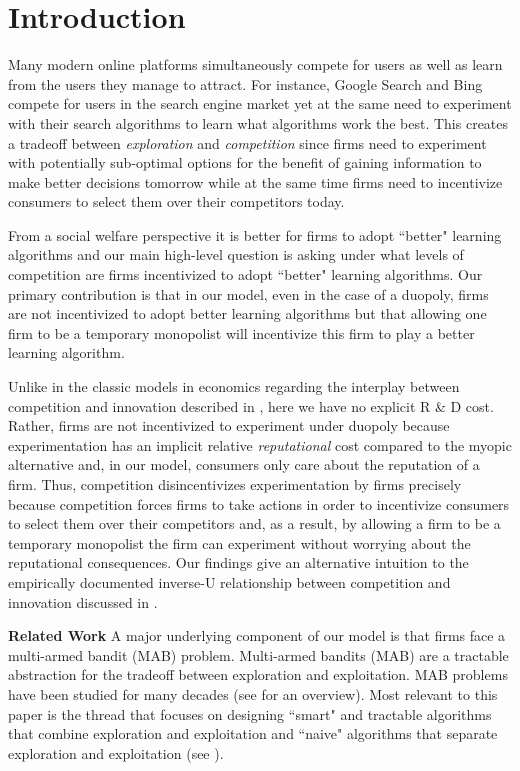 \documentclass{article}
\theoremstyle{definition}
\begin{document}
\section{Introduction}
\label{intro}

Many modern online platforms simultaneously compete for users as well as learn from the users they manage to attract. For instance, Google Search and Bing compete for users in the search engine market yet at the same need to experiment with their search algorithms to learn what algorithms work the best. This creates a tradeoff between \textit{exploration} and \textit{competition} since firms need to experiment with potentially sub-optimal options for the benefit of gaining information to make better decisions tomorrow while at the same time firms need to incentivize consumers to select them over their competitors today.

From a social welfare perspective it is better for firms to adopt ``better" learning algorithms and our main high-level question is asking under what levels of competition are firms incentivized to adopt ``better" learning algorithms. Our primary contribution is that in our model, even in the case of a duopoly, firms are not incentivized to adopt better learning algorithms but that allowing one firm to be a temporary monopolist will incentivize this firm to play a better learning algorithm. 

Unlike in the classic models in economics regarding the interplay between competition and innovation described in \citet{barro2004economic}, here we have no explicit R \& D cost. Rather, firms are not incentivized to experiment under duopoly because experimentation has an implicit relative \textit{reputational} cost compared to the myopic alternative and, in our model, consumers only care about the reputation of a firm. Thus, competition disincentivizes experimentation by firms precisely because competition forces firms to take actions in order to incentivize consumers to select them over their competitors and, as a result, by allowing a firm to be a temporary monopolist the firm can experiment without worrying about the reputational consequences. Our findings give an alternative intuition to the empirically documented inverse-U relationship between competition and innovation discussed in \citet{aghion2005competition}.

\textbf{Related Work} A major underlying component of our model is that firms face a multi-armed bandit (MAB) problem. Multi-armed bandits (MAB) are a tractable abstraction for the tradeoff between exploration and exploitation. MAB problems have been studied for many decades (see \citet{bubeck2012regret} for an overview). Most relevant to this paper is the thread that focuses on designing ``smart" and tractable algorithms that combine exploration and exploitation and ``naive" algorithms that separate exploration and exploitation (see \citet{slivkins2017bandits}).
\end{document}
